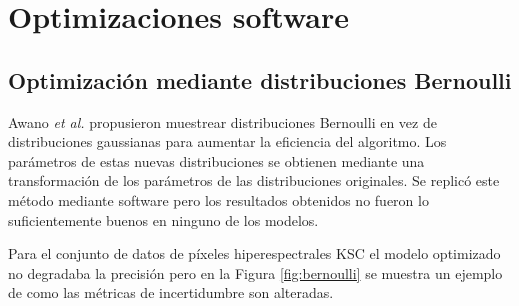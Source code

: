 
\chapter{Optimizaciones software}

\todo

\section{Optimización mediante distribuciones Bernoulli}

Awano \emph{et al.} \cite{bnn_clt_approx} propusieron muestrear distribuciones Bernoulli en vez de distribuciones gaussianas para aumentar la eficiencia del algoritmo. Los parámetros de estas nuevas distribuciones se obtienen mediante una transformación de los parámetros de las distribuciones originales. Se replicó este método mediante software pero los resultados obtenidos no fueron lo suficientemente buenos en ninguno de los modelos. 

Para el conjunto de datos de píxeles hiperespectrales KSC el modelo optimizado no degradaba la precisión pero en la Figura \ref{fig:bernoulli} se muestra un ejemplo de como las métricas de incertidumbre son alteradas.

